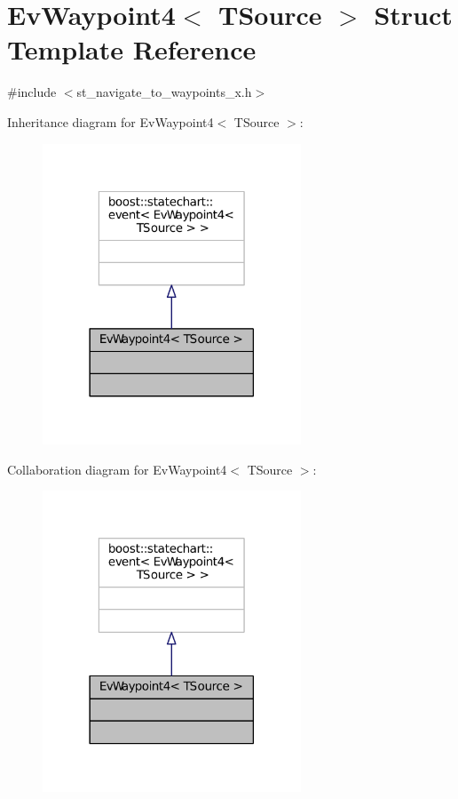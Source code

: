 \hypertarget{structEvWaypoint4}{}\section{Ev\+Waypoint4$<$ T\+Source $>$ Struct Template Reference}
\label{structEvWaypoint4}


{\ttfamily \#include $<$st\+\_\+navigate\+\_\+to\+\_\+waypoints\+\_\+x.\+h$>$}



Inheritance diagram for Ev\+Waypoint4$<$ T\+Source $>$\+:
\nopagebreak
\begin{figure}[H]
\begin{center}
\leavevmode
\includegraphics[width=218pt]{structEvWaypoint4__inherit__graph}
\end{center}
\end{figure}


Collaboration diagram for Ev\+Waypoint4$<$ T\+Source $>$\+:
\nopagebreak
\begin{figure}[H]
\begin{center}
\leavevmode
\includegraphics[width=218pt]{structEvWaypoint4__coll__graph}
\end{center}
\end{figure}


